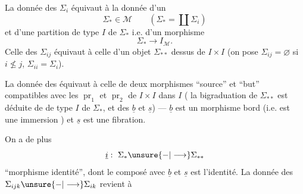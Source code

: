 
La donnée des \(\Sigma_i\) équivaut à la donnée d'un
\[
 \Sigma_*\in\mathcal M\qquad
 \left(\Sigma_*=\coprod\Sigma_i\right)
\]
et d'une partition de type \(I\) de \(\Sigma_*\) i.e. d'un morphisme
\[
 \Sigma_*\longrightarrow I_{\mathcal M}.
\]
Celle des \(\Sigma_{ij}\) équivaut à celle
d'un objet \(\Sigma_{**}\)   dessus de \(I\times I\)
(on pose \(\Sigma_{ij}=\varnothing\) si \(i\not\le j\),
\(\Sigma_{ii}=\Sigma_i\)).

La donnée des
équivaut à celle de deux morphismes ``source'' et ``but''
\diagram{\begin{tikzcd}
 \Sigma_{**}\arrow[r,"\underline b"]\arrow[d,"\underline s"']&\Sigma_*\\
 \Sigma_*&
\end{tikzcd}}
compatibles avec les \(\operatorname{pr}_1\) et \(\operatorname{pr}_2\)
de \(I\times I\) dans \(I\)
(
 la bigraduation 
de \(\Sigma_{**}\) est déduite de 
 de type \(I\) de \(\Sigma_*\), et des
\(\underline b\) et \(\underline s\)) ---
 \(\underline b\) est 
un morphisme bord (i.e. est une
immersion ) et \(\underline s\) est une fibration.

On a de plus 
\[
 \underline{i}:\ \Sigma_*\unsure{-|\longrightarrow}\Sigma_{**}
\]
``morphisme identité'', dont le composé avec \(\underline b\) et
\(\underline s\) est l'identité. La donnée des
\(\Sigma_{ijk}\unsure{-|\longrightarrow}\Sigma_{ik}\) revient à


